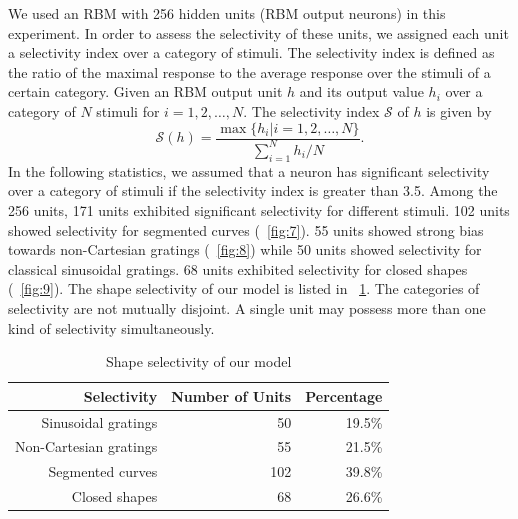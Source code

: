 \documentclass[conference]{IEEEtran}
\begin{document}
We used an RBM with 256 hidden units (RBM output neurons) in this experiment.
In order to assess the selectivity of these units,
we assigned each unit a selectivity index over a category of stimuli.
The selectivity index is defined as the ratio of the maximal response to the average response 
over the stimuli of a certain category.
Given an RBM output unit $h$ and its output value $h_i$ over a category of $N$ stimuli for $i=1,2,\dots,N$.
The selectivity index $\mathcal{S}$ of $h$ is given by
\begin{equation}
\mathcal{S}(h)=\frac{\max\{h_i|i=1,2,\dots,N\}}{\sum_{i=1}^N h_i/N}.
\end{equation}
In the following statistics, we assumed that a neuron has significant selectivity over a category of stimuli
if the selectivity index is greater than 3.5.
Among the 256 units, 171 units exhibited significant selectivity for different stimuli.
102 units showed selectivity for segmented curves (\figurename~\ref{fig:7}).
55 units showed strong bias towards non-Cartesian gratings (\figurename~\ref{fig:8})
while 50 units showed selectivity for classical sinusoidal gratings.
68 units exhibited selectivity for closed shapes (\figurename~\ref{fig:9}).
The shape selectivity of our model is listed in \tablename~\ref{tab:2}.
The categories of selectivity are not mutually disjoint.
A single unit may possess more than one kind of selectivity simultaneously.

\begin{table}[h]
\caption{Shape selectivity of our model}
\centering
\begin{tabular}{rrr}
\toprule
Selectivity & Number of Units & Percentage \\
\midrule
Sinusoidal gratings & 50 & 19.5\% \\
Non-Cartesian gratings & 55 & 21.5\% \\
Segmented curves & 102 & 39.8\% \\
Closed shapes & 68 & 26.6\% \\
\bottomrule
\end{tabular}
\label{tab:2}
\end{table}
\end{document}

